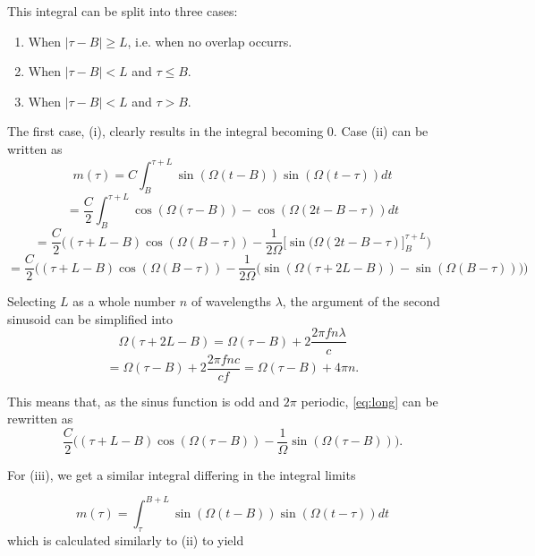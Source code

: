 \begin{appendices}
This integral can be split into three cases:
\begin{enumerate}[label=(\roman*)]
	\item When $|\tau-B| \geq L$, i.e. when no overlap occurrs. 
	\item When $|\tau-B| < L$ and $\tau \leq B$.
	\item When $|\tau-B| < L$ and $\tau > B$.
\end{enumerate}

The first case, (i), clearly results in the integral becoming 0. Case (ii) can be written as
\begin{equation}
	m(\tau)
	= C\int_{B}^{\tau+L}\sin(\Omega(t-B))\sin(\Omega(t-\tau))dt
\end{equation}
\begin{equation}
	= \frac{C}{2}\int_B^{\tau+L} \cos(\Omega(\tau-B)) - \cos(\Omega(2t - B - \tau))dt
\end{equation}
\begin{equation}
	= \frac{C}{2}\Big( (\tau+L-B)\cos(\Omega(B-\tau)) 
	- \frac{1}{2\Omega}\Big[ \sin(\Omega(2t-B-\tau) \Big]_{B}^{\tau+L} \Big)
\end{equation}
\begin{equation}\label{eq:long}
	= \frac{C}{2}\Big((\tau + L - B)\cos(\Omega(B-\tau))
	- \frac{1}{2\Omega}\big(
	\sin(\Omega(\tau + 2L - B))
	- \sin(\Omega(B-\tau))
	\big)\Big)
\end{equation}

Selecting $L$ as a whole number $n$ of wavelengths $\lambda$, the argument of the second sinusoid can be simplified into
\begin{equation}
	\Omega(\tau + 2L - B) 
	= \Omega(\tau - B) + 2\frac{2\pi f n\lambda}{c} 
\end{equation}
\begin{equation}
	= \Omega(\tau - B) + 2\frac{2\pi f n c}{c f}
	= \Omega(\tau - B) + 4\pi n.
\end{equation}

This means that, as the sinus function is odd and $2\pi$ periodic, \eqref{eq:long} can be rewritten as 
\begin{equation}\label{eq:first}
	 \frac{C}{2}\Big( (\tau+L-B)\cos(\Omega(\tau - B)) 
	- \frac{1}{\Omega}\sin(\Omega(\tau - B))\Big).
\end{equation}

For (iii), we get a similar integral differing in the integral limits

\begin{equation}
	m(\tau) 
	= \int_\tau^{B+L}\sin(\Omega(t-B))\sin(\Omega(t-\tau))dt
\end{equation}
which is calculated similarly to (ii) to yield


\end{appendices}
